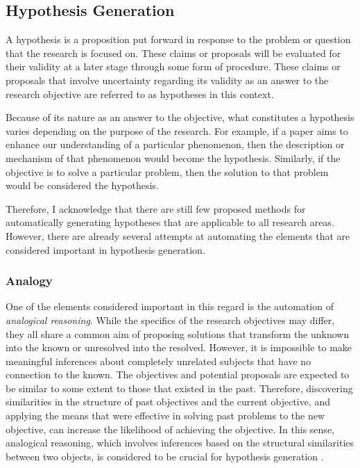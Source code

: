 \documentclass{book}
\begin{document}
\subsection{Hypothesis Generation}
A hypothesis is a proposition put forward in response to the problem or question that the research is focused on. These claims or proposals will be evaluated for their validity at a later stage through some form of procedure. These claims or proposals that involve uncertainty regarding its validity as an answer to the research objective are referred to as hypotheses in this context.

Because of its nature as an answer to the objective, what constitutes a hypothesis varies depending on the purpose of the research. For example, if a paper aims to enhance our understanding of a particular phenomenon, then the description or mechanism of that phenomenon would become the hypothesis. Similarly, if the objective is to solve a particular problem, then the solution to that problem would be considered the hypothesis. 

Therefore, I acknowledge that there are still few proposed methods for automatically generating hypotheses that are applicable to all research areas. However, there are already several attempts at automating the elements that are considered important in hypothesis generation.

\subsubsection{Analogy} 

One of the elements considered important in this regard is the automation of \textit{analogical reasoning}. While the specifics of the research objectives may differ, they all share a common aim of proposing solutions that transform the unknown into the known or unresolved into the resolved. However, it is impossible to make meaningful inferences about completely unrelated subjects that have no connection to the known. The objectives and potential proposals are expected to be similar to some extent to those that existed in the past. Therefore, discovering similarities in the structure of past objectives and the current objective, and applying the means that were effective in solving past problems to the new objective, can increase the likelihood of achieving the objective. In this sense, analogical reasoning, which involves inferences based on the structural similarities between two objects, is considered to be crucial for hypothesis generation \cite{hesse1965models,thagard_1984,gentner1993shift,holyoak1996mental,dunbar1997scientists,gentner2002analogy}. 
\end{document}

